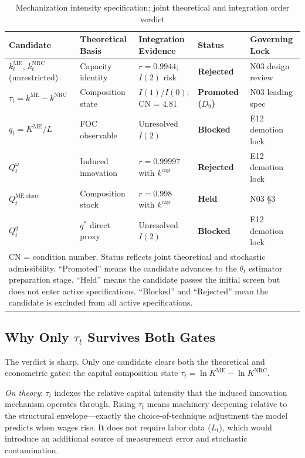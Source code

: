 \documentclass[11pt,a4paper]{article}
\begin{document}
\begin{table}[h!]
\centering
\small
\caption{Mechanization intensity specification: joint theoretical and integration order verdict}
\label{tab:mech_verdict}
\begin{tabular}{p{2.6cm} p{2.8cm} p{2.8cm} p{1.8cm} p{3.2cm}}
\toprule
\textbf{Candidate} & \textbf{Theoretical Basis} & \textbf{Integration Evidence} & \textbf{Status} & \textbf{Governing Lock} \\
\midrule
$k^{\text{ME}}_t$, $k^{\text{NRC}}_t$ (unrestricted) & Capacity identity & $r = 0.9944$; $I(2)$ risk & \textbf{Rejected} & N03 design review \\
$\tau_t = k^{\text{ME}} - k^{\text{NRC}}$ & Composition state & $I(1)$/$I(0)$; CN = 4.81 & \textbf{Promoted ($D_9$)} & N03 leading spec \\
$q_t = K^{\text{ME}}/L$ & FOC observable & Unresolved $I(2)$ & \textbf{Blocked} & E12 demotion lock \\
$Q_t^\omega$ & Induced innovation & $r = 0.99997$ with $k^{\text{cap}}$ & \textbf{Rejected} & E12 demotion lock \\
$Q_t^{\text{ME share}}$ & Composition stock & $r = 0.998$ with $k^{\text{cap}}$ & \textbf{Held} & N03 \S3 \\
$Q_t^q$ & $q^*$ direct proxy & Unresolved $I(2)$ & \textbf{Blocked} & E12 demotion lock \\
\bottomrule
\multicolumn{5}{p{13.2cm}}{\footnotesize CN = condition number. Status reflects joint theoretical and stochastic admissibility. ``Promoted'' means the candidate advances to the $\theta_t$ estimator preparation stage. ``Held'' means the candidate passes the initial screen but does not enter active specifications. ``Blocked'' and ``Rejected'' mean the candidate is excluded from all active specifications.}
\end{tabular}
\end{table}

\subsection{Why Only $\tau_t$ Survives Both Gates}

The verdict is sharp. Only one candidate clears both the theoretical and econometric gates: the capital composition state $\tau_t = \ln K^{\text{ME}} - \ln K^{\text{NRC}}$.

\textit{On theory}: $\tau_t$ indexes the relative capital intensity that the induced innovation mechanism operates through. Rising $\tau_t$ means machinery deepening relative to the structural envelope---exactly the choice-of-technique adjustment the model predicts when wages rise. It does not require labor data ($L_t$), which would introduce an additional source of measurement error and stochastic contamination.
\end{document}
